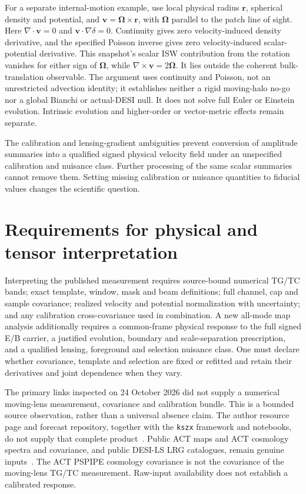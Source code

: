 \documentclass[aps,prd,reprint,onecolumn,notitlepage,nofootinbib]{revtex4-2}
\newcommand{\vect}[1]{\boldsymbol{#1}}
\begin{document}
For a separate internal-motion example, use local physical radius $\vect r$, spherical density and potential, and $\vect v=\vect\Omega\times\vect r$, with $\vect\Omega$ parallel to the patch line of sight. Here $\nabla\cdot\vect v=0$ and $\vect v\cdot\nabla\delta=0$. Continuity gives zero velocity-induced density derivative, and the specified Poisson inverse gives zero velocity-induced scalar-potential derivative. This snapshot's scalar ISW contribution from the rotation vanishes for either sign of $\vect\Omega$, while $\nabla\times\vect v=2\vect\Omega$. It lies outside the coherent bulk-translation observable. The argument uses continuity and Poisson, not an unrestricted advection identity; it establishes neither a rigid moving-halo no-go nor a global Bianchi or actual-DESI null. It does not solve full Euler or Einstein evolution. Intrinsic evolution and higher-order or vector-metric effects remain separate.

The calibration and lensing-gradient ambiguities prevent conversion of amplitude summaries into a qualified signed physical velocity field under an unspecified calibration and nuisance class. Further processing of the same scalar summaries cannot remove them. Setting missing calibration or nuisance quantities to fiducial values changes the scientific question.

\section{Requirements for physical and tensor interpretation}

Interpreting the published measurement requires source-bound numerical TG/TC bands; exact template, window, mask and beam definitions; full channel, cap and sample covariance; realized velocity and potential normalization with uncertainty; and any calibration cross-covariance used in combination. A new all-mode map analysis additionally requires a common-frame physical response to the full signed E/B carrier, a justified evolution, boundary and scale-separation prescription, and a qualified lensing, foreground and selection nuisance class. One must declare whether covariance, template and selection are fixed or refitted and retain their derivatives and joint dependence when they vary.

The primary links inspected on 24 October 2026 did not supply a numerical moving-lens measurement, covariance and calibration bundle. This is a bounded source observation, rather than a universal absence claim. The author resource page and forecast repository, together with the \texttt{kszx} framework and notebooks, do not supply that complete product~\cite{authorpage,forecast,kszx,notebooks}. Public ACT maps and ACT cosmology spectra and covariance, and public DESI-LS LRG catalogues, remain genuine inputs~\cite{actrelease,desirelease}. The ACT PSPIPE cosmology covariance is not the covariance of the moving-lens TG/TC measurement. Raw-input availability does not establish a calibrated response.
\end{document}
